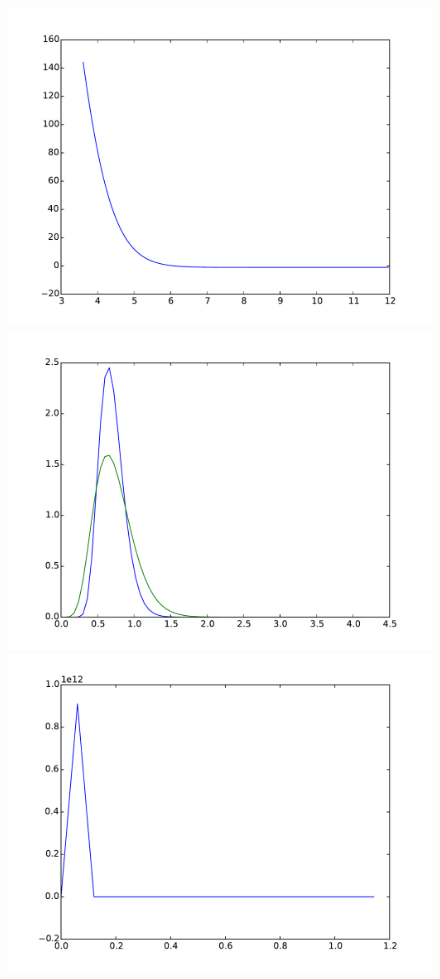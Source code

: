 \documentclass{article}
\begin{document}
\begin{figure}[htb]
\begin{minipage}{.3\textwidth}
		\includegraphics[width=0.97\linewidth]{bootstrap-filter/relative_tail_complex_1_3.pdf}
	\end{minipage}
	\begin{minipage}{.3\textwidth}
		\centering
		\includegraphics[width=0.97\linewidth]{bootstrap-filter/global_complex_3_1.pdf}
	\end{minipage}
	\begin{minipage}{.3\textwidth}
		\centering
		\includegraphics[width=0.97\linewidth]{bootstrap-filter/relative_beginning_complex_3_1.pdf}

\end{minipage}
\end{figure}
\end{document}
